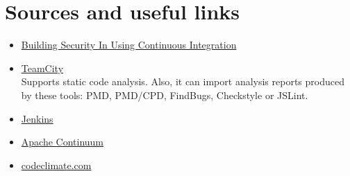 \documentclass[conference]{IEEEtran}
\begin{document}
\section{Sources and useful links}
\begin{itemize}
	\item \href{http://www.crosstalkonline.org/storage/issue-archives/2010/201003/201003-Stiehm.pdf}{Building Security In Using Continuous Integration}
	\item \href{http://www.jetbrains.com/teamcity}{TeamCity}\\
	Supports static code analysis. Also, it can import analysis reports produced by these tools: PMD, PMD/CPD, FindBugs, Checkstyle or JSLint.
	\item \href{http://jenkins-ci.org}{Jenkins}
	\item \href{http://continuum.apache.org}{Apache Continuum}	
	\item \href{http://codeclimate.com}{codeclimate.com}
\end{itemize}



\end{document}
